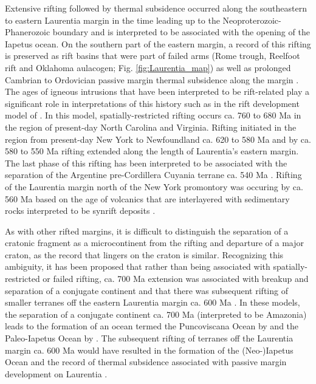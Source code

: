 \documentclass[twocolumn, switch]{article} %
\begin{document}
Extensive rifting followed by thermal subsidence occurred along the southeastern to eastern Laurentia margin in the time leading up to the Neoproterozoic-Phanerozoic boundary and is interpreted to be associated with the opening of the Iapetus ocean. On the southern part of the eastern margin, a record of this rifting is preserved as rift basins that were part of failed arms (Rome trough, Reelfoot rift and Oklahoma aulacogen; Fig. \ref{fig:Laurentia_map}) as well as prolonged Cambrian to Ordovician passive margin thermal subsidence along the margin \citep{Bond1984a, Whitmeyer2007a}. The ages of igneous intrusions that have been interpreted to be rift-related play a significant role in interpretations of this history such as in the rift development model of \citet{Burton2010a}. In this model, spatially-restricted rifting occurs ca. 760 to 680 Ma in the region of present-day North Carolina and Virginia. Rifting initiated in the region from present-day New York to Newfoundland ca. 620 to 580 Ma and by ca. 580 to 550 Ma rifting extended along the length of Laurentia's eastern margin. The last phase of this rifting has been interpreted to be associated with the separation of the Argentine pre-Cordillera Cuyania terrane ca. 540 Ma \citep{Dickerson1998a, Martin2019a}. Rifting of the Laurentia margin north of the New York promontory was occuring by ca. 560 Ma based on the age of volcanics that are interlayered with sedimentary rocks interpreted to be synrift deposits \citep{Hodych2007a}.

As with other rifted margins, it is difficult to distinguish the separation of a cratonic fragment as a microcontinent from the rifting and departure of a major craton, as the record that lingers on the craton is similar. Recognizing this ambiguity, it has been proposed that rather than being associated with spatially-restricted or failed rifting, ca. 700 Ma extension was associated with breakup and separation of a conjugate continent and that there was subsequent rifting of smaller terranes off the eastern Laurentia margin ca. 600 Ma \citep{Chew2008a, Escayola2011a, Robert2020a}. In these models, the separation of a conjugate continent ca. 700 Ma (interpreted to be Amazonia) leads to the formation of an ocean termed the Puncoviscana Ocean by \citet{Escayola2011a} and the Paleo-Iapetus Ocean by \citet{Robert2020a}. The subsequent rifting of terranes off the Laurentia margin ca. 600 Ma would have resulted in the formation of the (Neo-)Iapetus Ocean and the record of thermal subsidence associated with passive margin development on Laurentia \citep{Escayola2011a, Robert2020a}.
\end{document}
